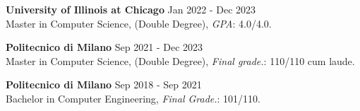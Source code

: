 
\noindent
\textbf{University of Illinois at Chicago} \hfill Jan 2022 - Dec 2023 \\
Master in Computer Science, (Double Degree), \textit{GPA}: 4.0/4.0.


\noindent
\textbf{Politecnico di Milano} \hfill Sep 2021 - Dec 2023 \\
Master in Computer Science, (Double Degree), \textit{Final grade.}: 110/110 cum laude.


\noindent
\textbf{Politecnico di Milano} \hfill Sep 2018 - Sep 2021 \\
Bachelor in Computer Engineering, \textit{Final Grade.}: 101/110.


